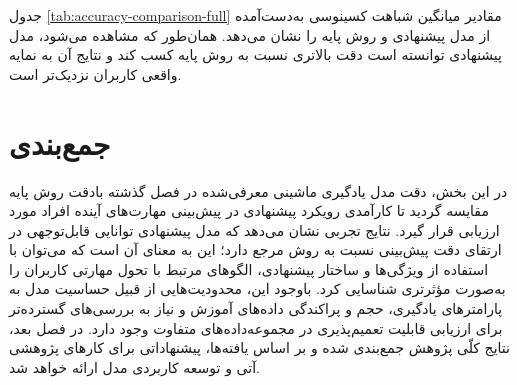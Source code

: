 جدول \ref{tab:accuracy-comparison-full} مقادیر میانگین شباهت کسینوسی به‌دست‌آمده از مدل پیشنهادی و روش پایه را نشان می‌دهد. همان‌طور که مشاهده می‌شود، مدل پیشنهادی توانسته است دقت بالاتری نسبت به روش پایه کسب کند و نتایج آن به نمایه واقعی کاربران نزدیک‌تر است.  

\begin{table}[ht]
   \centering
   \small
   \setlength{\tabcolsep}{8pt}
   \renewcommand{\arraystretch}{1.2}
   \caption[مقایسهٔ معیارها]{مقایسهٔ معیارهای شباهت بین روش‌های  پایه و مدل معرفی شده}
   \label{tab:accuracy-comparison-full}
 \end{table}
 
   

\section{جمع‌بندی}

در این بخش، دقت مدل یادگیری ماشینی معرفی‌شده در فصل گذشته بادقت روش پایه مقایسه گردید تا کارآمدی رویکرد پیشنهادی در پیش‌بینی مهارت‌های آینده افراد مورد ارزیابی قرار گیرد. نتایج تجربی نشان می‌دهد که مدل پیشنهادی توانایی قابل‌توجهی در ارتقای دقت پیش‌بینی نسبت به روش مرجع دارد؛ این به معنای آن است که می‌توان با استفاده از ویژگی‌ها و ساختار پیشنهادی، الگوهای مرتبط با تحول مهارتی کاربران را به‌صورت مؤثرتری شناسایی کرد. باوجود این، محدودیت‌هایی از قبیل حساسیت مدل به پارامترهای یادگیری، حجم و پراکندگی داده‌های آموزش و نیاز به بررسی‌های گسترده‌تر برای ارزیابی قابلیت تعمیم‌پذیری در مجموعه‌داده‌های متفاوت وجود دارد. در فصل بعد، نتایج کلّی پژوهش جمع‌بندی شده و بر اساس یافته‌ها، پیشنهاداتی برای کارهای پژوهشی آتی و توسعه کاربردی مدل ارائه خواهد شد.


